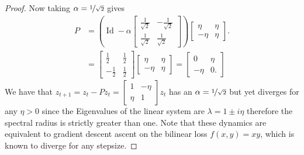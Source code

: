 \documentclass{article} %
\theoremstyle{definition}
\newcommand{\id}{\operatorname{Id}}
\begin{document}
\begin{proof}
Now taking $\alpha =\nicefrac{1}{\sqrt{2}}$ gives 
\begin{align*}
    P &= \left(\id - \alpha\begin{bmatrix}
    \frac{1}{\sqrt{2}}  & -\frac{1}{\sqrt{2}} \\
    \frac{1}{\sqrt{2}}  & \frac{1}{\sqrt{2}} 
\end{bmatrix}\right)
\begin{bmatrix}
    \eta & \eta \\
    -\eta & \eta
\end{bmatrix}.\\
&= \begin{bmatrix}
    \frac{1}{2}  & \frac{1}{2} \\
    -\frac{1}{2}  & \frac{1}{2} 
\end{bmatrix}
\begin{bmatrix}
    \eta & \eta \\
    -\eta & \eta
\end{bmatrix}=\begin{bmatrix}
    0 & \eta \\
    -\eta & 0.
\end{bmatrix}
\end{align*}
We have that $z_{t+1} = z_t - Pz_t = \begin{bmatrix}
    1 & -\eta \\
    \eta & 1
\end{bmatrix}z_t$ has an $\alpha = \nicefrac{1}{\sqrt{2}}$ but yet diverges for any $\eta > 0$ since the Eigenvalues of the linear system are $\lambda = 1 \pm i\eta$ therefore the spectral radius is strictly greater than one. 
Note that these dynamics are equivalent to gradient descent ascent on the bilinear loss $f(x,y) = xy$, which is known to diverge for any stepsize.

\end{proof}
\end{document}

